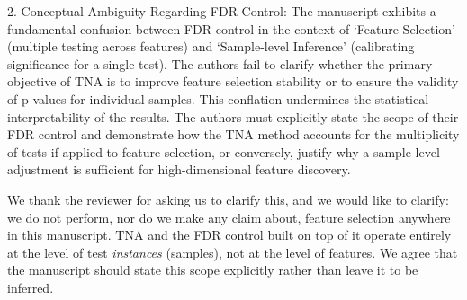 \documentclass{article}
\newcommand{\response}[1]{\vspace*{1ex} \color{blue} \noindent #1 \color{black}
\vspace*{2ex}}
\begin{document}
2. Conceptual Ambiguity Regarding FDR Control: The manuscript exhibits a fundamental confusion between FDR control in the context of `Feature Selection' (multiple testing across features) and `Sample-level Inference' (calibrating significance for a single test). The authors fail to clarify whether the primary objective of TNA is to improve feature selection stability or to ensure the validity of p-values for individual samples. This conflation undermines the statistical interpretability of the results. The authors must explicitly state the scope of their FDR control and demonstrate how the TNA method accounts for the multiplicity of tests if applied to feature selection, or conversely, justify why a sample-level adjustment is sufficient for high-dimensional feature discovery.

\response{We thank the reviewer for asking us to clarify this, and we would like to clarify: we do not perform, nor do we make any claim about, feature selection anywhere in this manuscript. TNA and the FDR control built on top of it operate entirely at the level of test {\em instances} (samples), not at the level of features.
We agree that the manuscript should state this scope explicitly rather than leave it to be inferred. %

}
\end{document}
